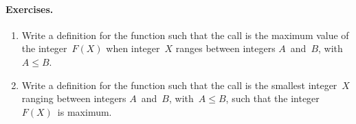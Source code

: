\medskip

\paragraph{Exercises.}
\label{ex:higher-order_functions}

\begin{enumerate}

  \item Write a definition for the function  such
    that the call  is the maximum
    value of the integer~\(F(X)\) when integer~\(X\) ranges between
    integers \(A\)~and~\(B\), with~\(A \leqslant B\).

  \item Write a definition for the function  such
    that the call  is the smallest
    integer~\(X\) ranging between integers \(A\)~and~\(B\), with~\(A
    \leqslant B\), such that the integer \(F(X)\)~is maximum.

\end{enumerate}

